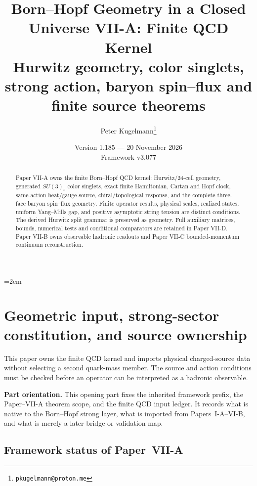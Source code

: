 \documentclass[12pt,a4paper]{article}
\title{\textbf{Born--Hopf Geometry in a Closed Universe VII-A: Finite QCD Kernel}\\[0.4em]
\large Hurwitz geometry, color singlets, strong action, baryon spin--flux and finite source theorems}
\author{Peter Kugelmann\thanks{\texttt{pkugelmann@proton.me}}}
\date{Version 1.185 --- 20 November 2026 \\ Framework v3.077}
\begin{document}
\emergencystretch=2em
\maketitle
\begin{abstract}
Paper VII-A owns the finite Born--Hopf QCD kernel: Hurwitz/24-cell
 geometry, generated $SU(3)_c$ color singlets, exact finite Hamiltonian, Cartan
 and Hopf clock, same-action heat/gauge source, chiral/topological response,
 and the complete three-face baryon spin--flux geometry. Finite operator
 results, physical scales, realized states, uniform Yang--Mills gap, and positive
 asymptotic string tension are distinct conditions. The derived Hurwitz split
 grammar is preserved as geometry. Full auxiliary matrices, bounds, numerical
 tests and conditional comparators are retained in Paper VII-D. Paper VII-B
 owns observable hadronic readouts and Paper VII-C bounded-momentum continuum
 reconstruction.
\end{abstract}
\tableofcontents
\listoftables
\clearpage

\section{Geometric input, strong-sector constitution, and source ownership}
\label{p10:sec:v237-a1}
This paper owns the finite QCD kernel and imports physical charged-source data without selecting a second quark-mass member. The source and action conditions must be checked before an operator can be interpreted as a hadronic observable.

\label{p10:part:finite-strong-sector-closure}

\noindent\textbf{Part orientation.}
This opening part fixes the inherited framework prefix, the Paper--VII-A theorem scope, and the finite QCD input ledger.  It records what is native to the Born--Hopf strong layer, what is imported from Papers~I-A--VI-B, and what is merely a later bridge or validation map.


\subsection{Framework status of Paper~VII-A}
\label{p10:sec:scope}
\end{document}
